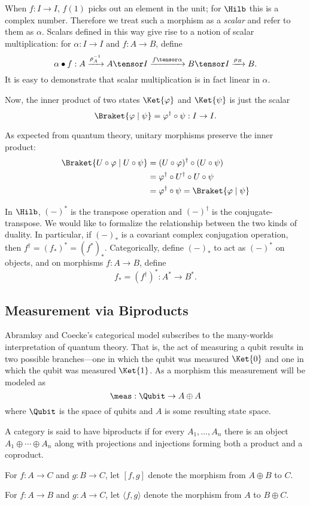 When $f : I \rightarrow I$, $f(1)$ picks out an element in the unit; for $\Hilb$ this is a complex
number. Therefore we treat such a morphism as a \emph{scalar} and refer to them as $\alpha$.
Scalars defined in this way give rise to a notion of scalar multiplication: for 
$\alpha : I \rightarrow I$ and $f : A \rightarrow B$, define
\[ \alpha \bullet f : A \xrightarrow{\rho_A^{-1}} A \tensor I
    \xrightarrow{f \tensor \alpha} B \tensor I
    \xrightarrow{\rho_B} B.
\]
It is easy to demonstrate that scalar multiplication is in fact linear in $\alpha$.

Now, the inner product of two states $\Ket{\varphi}$ and $\Ket{\psi}$
is just the scalar
\[ \Braket{\varphi \mid \psi} = \varphi^\dagger \circ \psi : I \rightarrow I. \]

As expected from quantum theory, unitary morphisms preserve the inner product:
\begin{align*}
    \Braket{U\circ \varphi \mid U \circ \psi}
    &= (U \circ \varphi)^\dagger \circ (U \circ \psi) \\
    &= \varphi^\dagger \circ U^\dagger \circ U \circ \psi \\
    &= \varphi^\dagger \circ \psi = \Braket{\varphi \mid \psi}
\end{align*}

In $\Hilb$, $(-)^*$ is the transpose operation and $(-)^\dagger$ is the conjugate-transpose.
We would like to formalize the relationship between the two kinds of duality. In particular, if 
$(-)_*$ is a covariant complex conjugation operation, then $f^\dagger = (f_*)^* = (f^*)_*$.
Categorically, define $(-)_*$ to act as $(-)^*$ on objects, and on morphisms $f: A \rightarrow B$,
define 
\[ f_* = (f^\dagger)^* : A^* \rightarrow B^*. \]

\subsection{Measurement via Biproducts}

Abramksy and Coecke's categorical model subscribes to the many-worlds interpretation of quantum
theory. That is, the act of measuring a qubit results in two possible branches---one in 
which the qubit was measured $\Ket{0}$ and one in which the qubit was measured $\Ket{1}$.
As a morphism this measurement will be modeled as
\[ \meas : \Qubit \rightarrow A \oplus A \]
where $\Qubit$ is the space of qubits and $A$ is some resulting state space.

\begin{definition}
    A category is said to have biproducts if for every $A_1,\ldots,A_n$
    there is an object $A_1 \oplus \cdots \oplus A_n$ along with
    projections and injections forming both a product and a coproduct.
    
    For $f : A \rightarrow C$ and $g : B \rightarrow C$, let $[f,g]$
    denote the morphism from $A \oplus B$ to $C$.

    For $f : A \rightarrow B$ and $g : A \rightarrow C$, let $\langle f,g\rangle$ denote
    the morphism from $A$ to $B \oplus C$.
\end{definition}

